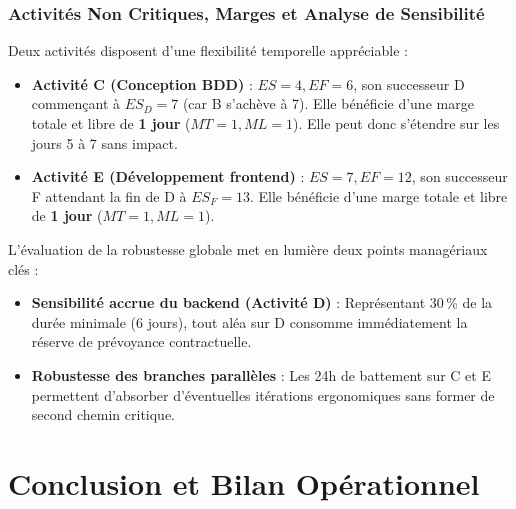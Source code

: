 \documentclass[a4paper,12pt]{report}
\begin{document}
	\subsection{Activités Non Critiques, Marges et Analyse de Sensibilité}
	Deux activités disposent d'une flexibilité temporelle appréciable :
	\begin{itemize}[leftmargin=1.0cm, noitemsep, topsep=1pt]
		\item \textbf{Activité C (Conception BDD)} : $ES = 4, EF = 6$, son successeur D commençant à $ES_D = 7$ (car B s'achève à 7). Elle bénéficie d'une marge totale et libre de \textbf{1 jour} ($MT=1, ML=1$). Elle peut donc s'étendre sur les jours 5 à 7 sans impact.
		\item \textbf{Activité E (Développement frontend)} : $ES = 7, EF = 12$, son successeur F attendant la fin de D à $ES_F = 13$. Elle bénéficie d'une marge totale et libre de \textbf{1 jour} ($MT=1, ML=1$).
	\end{itemize}
	L'évaluation de la robustesse globale met en lumière deux points managériaux clés :
	\begin{itemize}[leftmargin=1.0cm, noitemsep, topsep=1pt]
		\item \textbf{Sensibilité accrue du backend (Activité D)} : Représentant 30\,\% de la durée minimale (6 jours), tout aléa sur D consomme immédiatement la réserve de prévoyance contractuelle.
		\item \textbf{Robustesse des branches parallèles} : Les 24h de battement sur C et E permettent d'absorber d'éventuelles itérations ergonomiques sans former de second chemin critique.
	\end{itemize}

	\chapter{Conclusion et Bilan Opérationnel}
	
\end{document}
